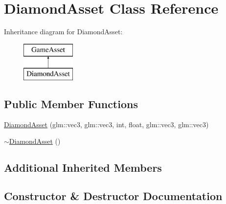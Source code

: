 \hypertarget{classDiamondAsset}{}\section{Diamond\+Asset Class Reference}
\label{classDiamondAsset}
Inheritance diagram for Diamond\+Asset\+:\begin{figure}[H]
\begin{center}
\leavevmode
\includegraphics[height=2.000000cm]{classDiamondAsset}
\end{center}
\end{figure}
\subsection*{Public Member Functions}
\begin{DoxyCompactItemize}
\item 
\hyperlink{classDiamondAsset_a8023636a5affbf3f7347908a1891d02e}{Diamond\+Asset} (glm\+::vec3, glm\+::vec3, int, float, glm\+::vec3, glm\+::vec3)
\item 
\hyperlink{classDiamondAsset_a1b7bf6ba76651a9304943f2c41fe36b8}{$\sim$\+Diamond\+Asset} ()
\end{DoxyCompactItemize}
\subsection*{Additional Inherited Members}


\subsection{Constructor \& Destructor Documentation}
\hypertarget{classDiamondAsset_a8023636a5affbf3f7347908a1891d02e}{}
